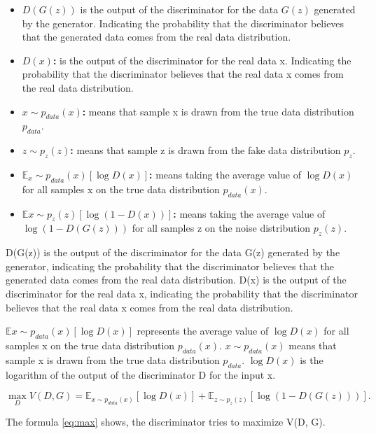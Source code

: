 \begin{itemize}
    \item \textbf{ $D(G(z))$} is the output of the discriminator for the data $G(z)$ generated by the generator. Indicating the probability that the discriminator believes that the generated data comes from the real data distribution.
    \item \textbf{$D(x)$:} is the output of the discriminator for the real data x. Indicating the probability that the discriminator believes that the real data x comes from the real data distribution.
    \item \textbf{ $x \sim p_{data}(x)$:} means that sample x is drawn from the true data distribution $p_{data}$.
    \item \textbf{ $z \sim p_{z}(z)$:} means that sample z is drawn from the fake data distribution $p_{z}$.
    \item \textbf{$\mathbb{E}{_x \sim p_{data}(x)}[\log D(x)]$:} means taking the average value of $\log D(x)$ for all samples x on the true data distribution $p_{data}(x)$.
    \item \textbf{$\mathbb{E}{x \sim p_{z}(z)}[\log (1 - D(x))]$:} means taking the average value of $\log (1 - D(G(z)))$ for all samples z on the noise distribution $p_z(z)$.
\end{itemize}




D(G(z)) is the output of the discriminator for the data G(z) generated by the generator, 
indicating the probability that the discriminator believes that the generated data comes from the real data distribution.
D(x) is the output of the discriminator for the real data x, 
indicating the probability that the discriminator believes that the real data x comes from the real data distribution.

$\mathbb{E}{x \sim p_{data}(x)}[\log D(x)]$ represents the average value of $\log D(x)$ for all samples x on the true data distribution $p_{data}(x)$.
$x \sim p_{data}(x)$ means that sample x is drawn from the true data distribution $p_{data}$.
$\log D(x)$ is the logarithm of the output of the discriminator D for the input x.


\begin{equation}
    \label{eq:max}
    \max_{D} V(D, G) = \mathbb{E}_{x \sim p_{data}(x)} [\log D(x)] + \mathbb{E}_{z \sim p_{z}(z)} [\log(1 - D(G(z)))].
\end{equation}

The formula \eqref{eq:max} shows, the discriminator tries to maximize V(D, G).





